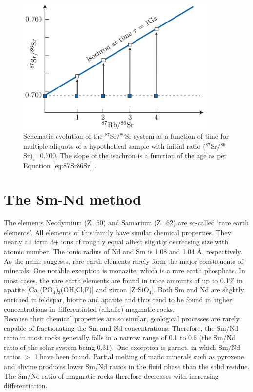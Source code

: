 \documentclass{book}
\newif\ifpdf
\begin{document}
\begin{figure}[!ht]
  \centering
  \ifpdf
  \def\svgwidth{.8\textwidth}
  
  \else
  \includegraphics[width=10cm]{isochron.png}
  \fi
  \caption{Schematic evolution of the $^{87}$Sr$/{}^{86}$Sr-system as
    a function of time for multiple aliquots of a hypothetical sample
    with initial ratio $({}^{87}$Sr$/{}^{86}$Sr$)_\circ$=0.700. The
    slope of the isochron is a function of the age as per Equation
    \ref{eq:87Sr86Sr} \citep[modified from][]{allegre2008}.}
  \label{fig:isochron}
\end{figure}

\section{The Sm-Nd method}
\label{sec:Sm-Nd}

The elements Neodymium (Z=60) and Samarium (Z=62) are so-called `rare
earth elements'.  All elements of this family have similar chemical
properties. They nearly all form 3+ ions of roughly equal albeit
slightly decreasing size with atomic number.  The ionic radius of Nd
and Sm is 1.08 and 1.04 \AA, respectively.  As the name suggests, rare
earth elements rarely form the major constituents of minerals.  One
notable exception is monazite, which is a rare earth phosphate. In
most cases, the rare earth elements are found in trace amounts of up
to 0.1\% in apatite [Ca$_5$(PO$_4$)$_3$(OH,Cl,F)] and zircon
[ZrSiO$_4$]. Both Sm and Nd are slightly enriched in feldspar, biotite
and apatite and thus tend to be found in higher concentrations in
differentiated (alkalic) magmatic rocks.\\

Because their chemical properties are so similar, geological processes
are rarely capable of fractionating the Sm and Nd
concentrations. Therefore, the Sm/Nd ratio in most rocks generally
falls in a narrow range of 0.1 to 0.5 (the Sm/Nd ratio of the solar
system being 0.31). One exception is garnet, in which Sm/Nd ratios $>$
1 have been found. Partial melting of mafic minerals such as pyroxene
and olivine produces lower Sm/Nd ratios in the fluid phase than the
solid residue.  The Sm/Nd ratio of magmatic rocks therefore decreases
with increasing differentiation.\\
\end{document}
